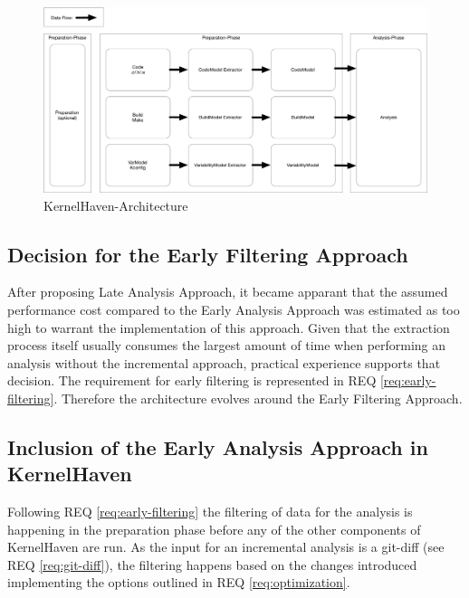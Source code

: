 \documentclass[a4paper]{article}
\begin{document}
\begin{figure}[htbp] 
  \centering
  \begin{minipage}[b]{1\textwidth} 
    \caption[KernelHaven-Architecture]{KernelHaven-Architecture}\label{fig:KernelHaven-Architecture}
    \includegraphics[width=1\textwidth]{img/KernelHaven.pdf}
  \end{minipage}
\end{figure}




\subsection{Decision for the Early Filtering Approach }

After proposing Late Analysis Approach, it became apparant that the assumed performance cost compared to the Early Analysis Approach was estimated as too high to warrant the implementation of this approach. Given that the extraction process itself usually consumes the largest amount of time when performing an analysis without the incremental approach, practical experience supports that decision. The requirement for early filtering is represented in REQ \ref{req:early-filtering}. Therefore the architecture evolves around the Early Filtering Approach.

\subsection{Inclusion of the Early Analysis Approach in KernelHaven}

Following REQ \ref{req:early-filtering} the filtering of data for the analysis is happening in the preparation phase before any of the other components of KernelHaven are run. As the input for an incremental analysis is a git-diff (see REQ \ref{req:git-diff}), the filtering happens based on the changes introduced implementing the options outlined in REQ \ref{req:optimization}.
\end{document}
